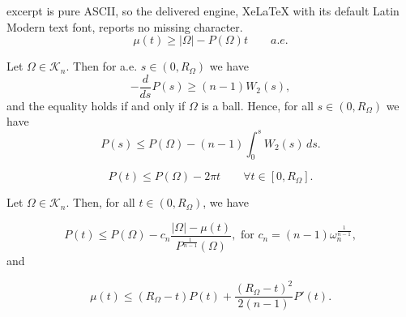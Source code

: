 \documentclass[10pt,a4paper]{amsart}
\newcommand{\abs}[1]{{\left|#1\right|}}
\begin{document}
excerpt is pure ASCII, so the delivered engine, XeLaTeX with its default Latin Modern text font, reports no missing character.
\begin{equation}
\label{steiner-measure}
    \mu(t) \ge \abs{\Omega}-P(\Omega)t \qquad a.e.
\end{equation}

\begin{lemma}
\label{lema22}
Let $\Omega\in \mathcal{K}_n$. Then for a.e. $s\in (0,R_\Omega)$ we have
    \begin{equation*}
        -\frac{d}{ds}P(s) \ge (n-1) W_2(s),
    \end{equation*}
and the equality holds if and only if $\Omega$ is a ball.
Hence, for all $s\in (0,R_\Omega)$ we have  \begin{equation}\label{eq:PerW2}
       P(s) \le P(\Omega)-(n-1)\int_0^s W_2(s)\,ds.
    \end{equation}
\end{lemma}

  \begin{equation}\label{steiner1}
     P(t)\leq P(\Omega)-2\pi t \qquad \forall t \in [0,R_\Omega].
 \end{equation}

\begin{lemma}
Let $\Omega\in \mathcal{K}_n$. Then, for all $t\in (0,R_\Omega)$, we have

\begin{equation}
    \label{perimeter_estimate}
    P(t)\leq P(\Omega) - c_n \frac{\abs{\Omega} - \mu(t)}{P^{\frac{1}{n-1}}(\Omega)}, \text{ for } c_n=(n-1)\omega_n^{\frac{1}{n-1}},
\end{equation}
and 

\begin{equation}
    \label{measure_estimate1}
    \mu(t)\leq (R_\Omega-t)P(t)+ \frac{(R_\Omega-t)^2}{2(n-1)}P'(t).
\end{equation}
\end{lemma}
\end{document}
